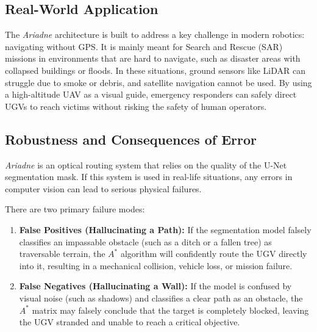 \documentclass[12pt, a4paper]{article}
\begin{document}
\subsection{Real-World Application}

\quad The \textit{Ariadne} architecture is built to address a key challenge in modern robotics: navigating without GPS. It is mainly meant for Search and Rescue (SAR) missions in environments that are hard to navigate, such as disaster areas with collapsed buildings or floods. In these situations, ground sensors like LiDAR can struggle due to smoke or debris, and satellite navigation cannot be used. By using a high-altitude UAV as a visual guide, emergency responders can safely direct UGVs to reach victims without risking the safety of human operators.

\vspace{0.5cm}

\subsection{Robustness and Consequences of Error}

\quad \textit{Ariadne} is an optical routing system that relies on the quality of the U-Net segmentation mask. If this system is used in real-life situations, any errors in computer vision can lead to serious physical failures.

\vspace{0.5cm}

\hspace{-1.5em}There are two primary failure modes:

\begin{enumerate}
  \item \textbf{False Positives (Hallucinating a Path):} If the segmentation model falsely classifies an impassable obstacle (such as a ditch or a fallen tree) as traversable terrain, the $A^*$ algorithm will confidently route the UGV directly into it, resulting in a mechanical collision, vehicle loss, or mission failure.
  
  \item \textbf{False Negatives (Hallucinating a Wall):} If the model is confused by visual noise (such as shadows) and classifies a clear path as an obstacle, the $A^*$ matrix may falsely conclude that the target is completely blocked, leaving the UGV stranded and unable to reach a critical objective.
\end{enumerate}

\newpage
\end{document}
